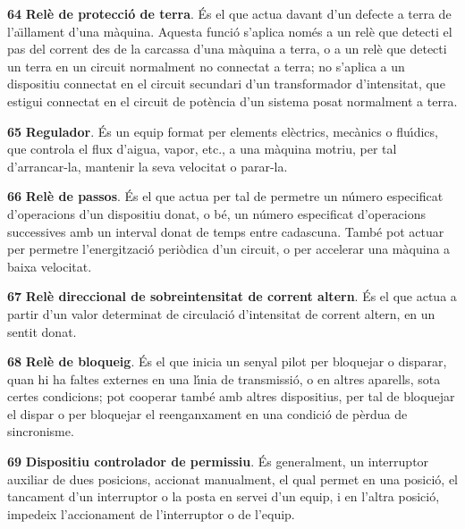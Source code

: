 \begin{multicols}{2}
\begin{list}{}
\item[\textbf{64}]  \textbf{Rel\`{e} de protecci\'{o} de terra}.
\'{E}s el que actua davant d'un defecte a terra de l'a\"{\i}llament d'una
m\`{a}quina. Aquesta funci\'{o} s'aplica nom\'{e}s a un rel\`{e} que detecti el pas
del corrent des de la carcassa  d'una m\`{a}quina a terra, o a un rel\`{e}
que detecti un terra en un circuit normalment no connectat a terra;
no s'aplica a un dispositiu connectat en el circuit secundari d'un
transformador d'intensitat, que estigui connectat en el circuit de
pot\`{e}ncia d'un sistema posat normalment a terra.

\item[\textbf{65}]  \textbf{Regulador}. \'{E}s un equip format per elements
el\`{e}ctrics, mec\`{a}nics o flu\'{\i}dics,  que controla el flux d'aigua,
vapor, etc.,  a una m\`{a}quina motriu, per tal d'arrancar-la, mantenir
la seva velocitat o parar-la.

\item[\textbf{66}]  \textbf{Rel\`{e} de passos}. \'{E}s el que actua per tal
de permetre un n\'{u}mero especificat d'operacions d'un dispositiu
donat, o b\'{e}, un n\'{u}mero especificat d'operacions successives amb un
interval donat de temps entre cadascuna. Tamb\'{e} pot actuar per
permetre l'energitzaci\'{o} peri\`{o}dica d'un circuit, o per accelerar una
m\`{a}quina a baixa velocitat.

\item[\textbf{67}] 
\textbf{Rel\`{e} direccional de sobreintensitat de corrent altern}. \'{E}s
el que actua a partir d'un valor determinat de circulaci\'{o}
d'intensitat  de corrent altern, en un sentit donat.

\item[\textbf{68}]  \textbf{Rel\`{e} de bloqueig}. \'{E}s el que inicia un
senyal pilot per bloquejar o disparar, quan hi ha faltes externes en
una l\'{\i}nia de transmissi\'{o}, o en altres aparells, sota certes
condicions; pot cooperar tamb\'{e} amb altres dispositius, per tal de
bloquejar el dispar o per bloquejar el reenganxament en una condici\'{o}
de p\`{e}rdua de sincronisme.

\item[\textbf{69}]  \textbf{Dispositiu controlador de permissiu}. \'{E}s
generalment, un interruptor auxiliar de dues posicions, accionat
manualment, el qual permet en una posici\'{o}, el tancament d'un
interruptor o la posta en servei d'un equip, i en l'altra posici\'{o},
impedeix l'accionament de l'interruptor o de l'equip.


\end{list}
\end{multicols}
